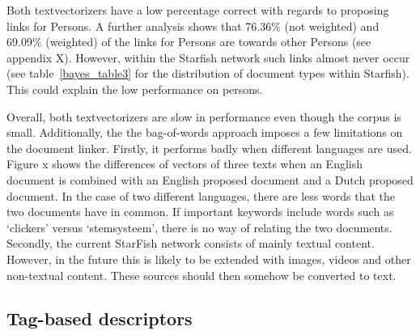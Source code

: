 Both textvectorizers have a low percentage correct with regards to proposing
links for Persons. A further analysis shows that 76.36\% (not weighted) and
69.09\% (weighted) of the links for Persons are towards other Persons (see
appendix X). However, within the Starfish network such links almost never occur
(see table~\ref{bayes_table3} for the distribution of document types within
Starfish). This could explain the low performance on persons. 

Overall, both textvectorizers are slow in performance even though the corpus is
small. Additionally, the the bag-of-words approach imposes a few limitations on
the document linker. Firstly, it performs badly when different languages are
used. Figure x shows the differences of vectors of three texts when an English
document is combined with an English proposed document and a Dutch proposed
document. In the case of two different languages, there are less words that the
two documents have in common. If important keywords include words such as
`clickers' versus `stemsysteem', there is no way of relating the two documents.
Secondly, the current StarFish network consists of mainly textual content.
However, in the future this is likely to be extended with images, videos and
other non-textual content. These sources should then somehow be converted to
text.

\subsection{Tag-based descriptors}

